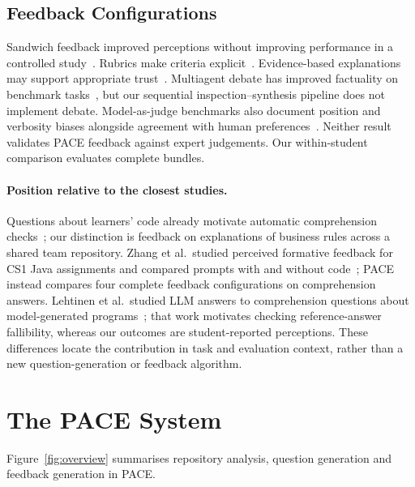\documentclass[runningheads]{llncs}
\begin{document}
\subsection{Feedback Configurations}
Sandwich feedback improved perceptions without improving performance in a controlled study~\cite{parkes2013feedback}. Rubrics make criteria explicit~\cite{jonsson2007use}. Evidence-based explanations may support appropriate trust~\cite{khosravi2022explainable}. Multiagent debate has improved factuality on benchmark tasks~\cite{du2024improving}, but our sequential inspection--synthesis pipeline does not implement debate. Model-as-judge benchmarks also document position and verbosity biases alongside agreement with human preferences~\cite{zheng2023judging}. Neither result validates PACE feedback against expert judgements. Our within-student comparison evaluates complete bundles.

\paragraph{Position relative to the closest studies.}
Questions about learners' code already motivate automatic comprehension checks~\cite{lehtinen2021lets}; our distinction is feedback on explanations of business rules across a shared team repository. Zhang et al.\ studied perceived formative feedback for CS1 Java assignments and compared prompts with and without code~\cite{zhang2024students}; PACE instead compares four complete feedback configurations on comprehension answers. Lehtinen et al.\ studied LLM answers to comprehension questions about model-generated programs~\cite{lehtinen2024askai}; that work motivates checking reference-answer fallibility, whereas our outcomes are student-reported perceptions. These differences locate the contribution in task and evaluation context, rather than a new question-generation or feedback algorithm.


\section{The PACE System}
\label{sec:system}

Figure~\ref{fig:overview} summarises repository analysis, question generation and feedback generation in PACE.
\end{document}
